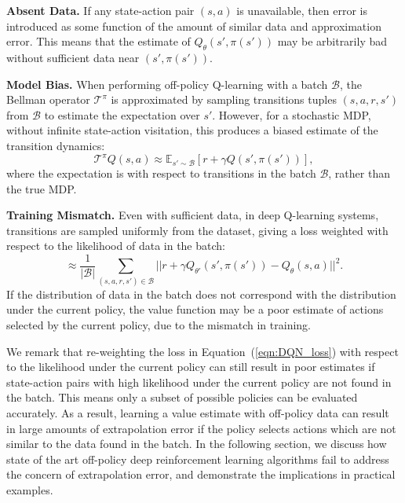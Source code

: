 \documentclass{article}
\newcommand{\y}{\gamma}
\newcommand{\ta}{\theta}
\newcommand{\E}{\mathbb{E}}
\newcommand{\B}{\mathcal{B}}
\begin{document}
\textbf{Absent Data.} If any state-action pair $(s,a)$ is unavailable, then error is introduced as some function of the amount of similar data and approximation error. This means that the estimate of $Q_\ta(s',\pi(s'))$ may be arbitrarily bad without sufficient data near $(s',\pi(s'))$.


\textbf{Model Bias.} When performing off-policy Q-learning with a batch $\B$, the Bellman operator $\mathcal{T}^\pi$ is approximated by sampling transitions tuples $(s,a,r,s')$ from $\B$ to estimate the expectation over $s'$. However, for a stochastic MDP, without infinite state-action visitation, this produces a biased estimate of the transition dynamics: 
\begin{equation}
\mathcal{T}^\pi Q(s,a) \approx \E_{s' \sim \B} [r + \y Q(s',\pi(s'))],
\end{equation}
where the expectation is with respect to transitions in the batch $\B$, rather than the true MDP. 

\textbf{Training Mismatch.} Even with sufficient data, in deep Q-learning systems, transitions are sampled uniformly from the dataset, giving a loss weighted with respect to the likelihood of data in the batch: 
\begin{equation} \label{eqn:DQN_loss}
\approx \frac{1}{|\B|} \sum_{(s,a,r,s')\in\B} ||r + \y Q_{\ta'}(s',\pi(s')) - Q_\ta(s,a) ||^2. 
\end{equation}
If the distribution of data in the batch does not correspond with the distribution under the current policy, the value function may be a poor estimate of actions selected by the current policy, due to the mismatch in training. 

We remark that re-weighting the loss in Equation~(\ref{eqn:DQN_loss}) with respect to the likelihood under the current policy can still result in poor estimates if state-action pairs with high likelihood under the current policy are not found in the batch. This means only a subset of possible policies can be evaluated accurately. As a result, learning a value estimate with off-policy data can result in large amounts of extrapolation error if the policy selects actions which are not similar to the data found in the batch. In the following section, we discuss how state of the art off-policy deep reinforcement learning algorithms fail to address the concern of extrapolation error, and demonstrate the implications in practical examples. 
\end{document}
